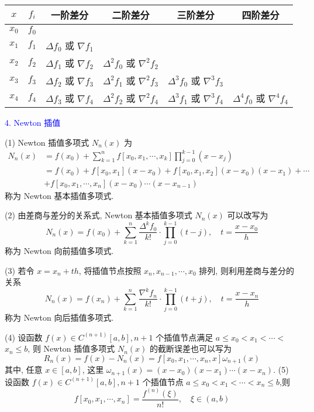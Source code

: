 \begin{center}
\begin{tabular}{cccccc}
\hline$ x $ & $ f_{i} $ & 一阶差分 & 二阶差分 & 三阶差分 & 四阶差分 \\
\hline$ x_{0} $ & $ f_{0} $ & & & & \\
$ x_{1} $ & $ f_{1} $ & $ \Delta f_{0} $ 或 $ \nabla f_{1} $ & & & \\
$ x_{2} $ & $ f_{2} $ & $ \Delta f_{1} $ 或 $ \nabla f_{2} $ & $ \Delta^{2} f_{0} $ 或 $ \nabla^{2} f_{2} $ & & \\
$ x_{3} $ & $ f_{3} $ & $ \Delta f_{2} $ 或 $ \nabla f_{3} $ & $ \Delta^{2} f_{1} $ 或 $ \nabla^{2} f_{3} $ & $ \Delta^{3} f_{0} $ 或 $ \nabla^{3} f_{3} $ & \\
$ x_{4} $ & $ f_{4} $ & $ \Delta f_{3} $ 或 $ \nabla f_{4} $ & $ \Delta^{2} f_{2} $ 或 $ \nabla^{2} f_{4} $ & $ \Delta^{3} f_{1} $ 或 $ \nabla^{3} f_{4} $ & $ \Delta^{4} f_{0} $ 或 $ \nabla^{4} f_{4} $ \\
\hline
\end{tabular}
\end{center}

\textcolor{blue}{4. Newton 插值}

(1) Newton 插值多项式 $ N_{n}(x) $ 为
$$ \begin{aligned} N_{n}(x)&=f\left(x_{0}\right)+\sum_{k=1}^{n} f\left[x_{0}, x_{1}, \cdots, x_{k}\right] \prod_{j=0}^{k-1}\left(x-x_{j}\right)\\&=  f\left(x_{0}\right)+f\left[x_{0}, x_{1}\right]\left(x-x_{0}\right)+f\left[x_{0}, x_{1}, x_{2}\right]\left(x-x_{0}\right)\left(x-x_{1}\right)+\cdots \\ & +f\left[x_{0}, x_{1}, \cdots, x_{n}\right]\left(x-x_{0}\right) \cdots\left(x-x_{n-1}\right)\end{aligned} $$
称为 Newton 基本插值多项式.

(2) 由差商与差分的关系式, Newton 基本插值多项式 $ N_{n}(x) $ 可以改写为
$$
N_{n}(x)=f\left(x_{0}\right)+\sum_{k=1}^{n} \frac{\Delta^{k} f_{0}}{k!} \cdot \prod_{j=0}^{k-1}(t-j), \quad t=\frac{x-x_{0}}{h}
$$
称为 Newton 向前插值多项式.

(3) 若令 $ x=x_{n}+t h $, 将插值节点按照 $ x_{n}, x_{n-1}, \cdots, x_{0} $ 排列, 则利用差商与差分的关系
$$
N_{n}(x)=f\left(x_{n}\right)+\sum_{k=1}^{n} \frac{\nabla^{k} f_{n}}{k!} \cdot \prod_{j=0}^{k-1}(t+j), \quad t=\frac{x-x_{n}}{h}
$$
称为 Newton 向后插值多项式.

(4) 设函数 $ f(x) \in C^{(n+1)}[a, b], n+1 $ 个插值节点满足 $ a \leqslant x_{0}<x_{1}<\cdots< $ $ x_{n} \leqslant b $, 则 Newton 插值多项式 $ N_{n}(x) $ 的截断误差也可以写为
$$
R_{n}(x)=f(x)-N_{n}(x)=f\left[x_{0}, x_{1}, \cdots, x_{n}, x\right] \omega_{n+1}(x)
$$
其中, 任意 $ x \in[a, b] $, 这里 $ \omega_{n+1}(x)=\left(x-x_{0}\right)\left(x-x_{1}\right) \cdots\left(x-x_{n}\right) $.
(5) 设函数 $ f(x) \in C^{(n+1)}[a, b], n+1 $ 个插值节点 $ a \leqslant x_{0}<x_{1}<\cdots<x_{n} \leqslant b $,则
$$
f\left[x_{0}, x_{1}, \cdots, x_{n}\right]=\frac{f^{(n)}(\xi)}{n!}, \quad \xi \in(a, b)
$$

